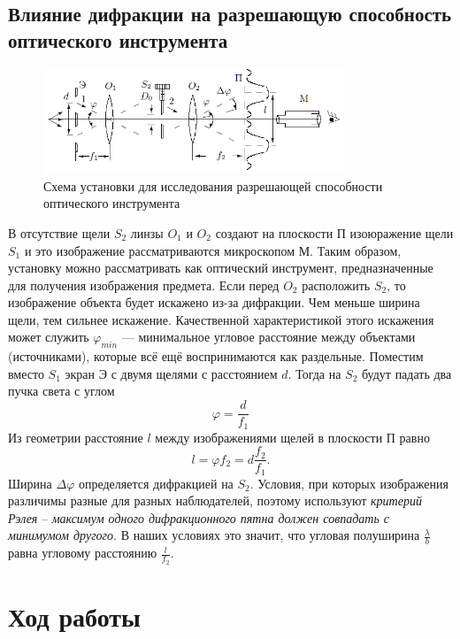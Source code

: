 \documentclass[a4paper, 12pt]{article}
\begin{document}
	\subsection{Влияние дифракции на разрешающую способность оптического инструмента}
		\begin{figure}[h]
			\includegraphics[width = 0.8\textwidth]{431-6.png}
			\centering
			\caption{Схема установки для исследования разрешающей способности оптического инструмента}
		\end{figure}
		В отсутствие щели $S_2$ линзы $O_1$ и $O_2$ создают на плоскости П изоюражение щели $S_1$ и это изображение рассматриваются микроскопом М. Таким образом, установку можно рассматривать как оптический инструмент, предназначенные для получения изображения предмета. Если перед $O_2$ расположить $S_2$, то изображение объекта будет искажено из-за дифракции. Чем меньше ширина щели, тем сильнее искажение. Качественной характеристикой этого искажения может служить $\varphi_{min}$ --- минимальное угловое расстояние между объектами (источниками), которые всё ещё воспринимаются как раздельные. Поместим вместо $S_1$ экран Э с двумя щелями с расстоянием $d$. Тогда на $S_2$ будут падать два пучка света с углом
		\begin{equation}
		\varphi = \dfrac{d}{f_1}
		\end{equation}
		Из геометрии расстояние $l$ между изображениями щелей в плоскости П равно
		\begin{equation}
		l = \varphi f_2 = d \dfrac{f_2}{f_1}.
		\end{equation}
		Ширина $\Delta \varphi$ определяется дифракцией на $S_2$. Условия, при которых изображения различимы разные для разных наблюдателей, поэтому используют \textit{критерий Рэлея} -- \textit{максимум одного дифракционного пятна должен совпадать с минимумом другого}. В наших условиях это значит, что угловая полуширина $\frac{\lambda}{b}$ равна угловому расстоянию $\frac{l}{f_2}$.

\section{Ход работы}
\end{document}
